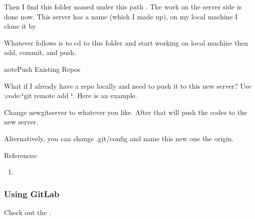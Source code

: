 \documentclass[letterpaper,12pt,english]{sphinxmanual}
\begin{document}
Then I find this folder named  under this path . The work on the server side is done now. This server has a name  (which I made up), on my local machine I clone it by

\begin{sphinxVerbatim}[commandchars=\\\{\}]
  
\end{sphinxVerbatim}

Whatever follows is to cd to this folder and start working on local machine then add, commit, and push.

\begin{sphinxadmonition}{note}{Push Existing Repos}

What if I already have a repo locally and need to push it to this new server? Use :code:{\color{red}\bfseries{}{}`}git remote add {\color{red}\bfseries{}{}`}. Here is an example.

\begin{sphinxVerbatim}[commandchars=\\\{\}]
    
\end{sphinxVerbatim}

Change newgitserver to whatever you like. After that  will push the codes to the new server.

Alternatively, you can change .git/config and name this new one the origin.
\end{sphinxadmonition}

References:
\begin{enumerate}
\item {} 

\end{enumerate}


\subsubsection{Using GitLab}
\label{\detokenize{tools/git:using-gitlab}}
Check out the .
\end{document}
